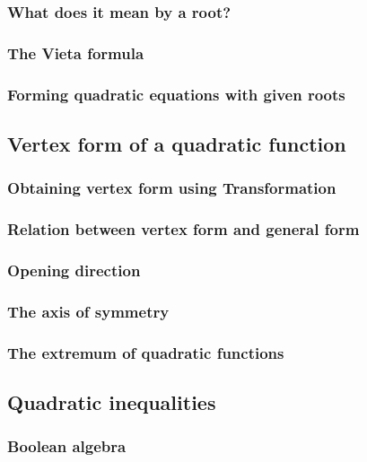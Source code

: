 \documentclass[12pt]{article}
\begin{document}
    \subsubsection{What does it mean by a root?}

    \subsubsection{The Vieta formula}

    \subsubsection{Forming quadratic equations with given roots}

    \subsection{Vertex form of a quadratic function}

    \subsubsection{Obtaining vertex form using Transformation}

    \subsubsection{Relation between vertex form and general form}

    \subsubsection{Opening direction}

    \subsubsection{The axis of symmetry}

    \subsubsection{The extremum of quadratic functions}

    \subsection{Quadratic inequalities}

    \subsubsection{Boolean algebra}
\end{document}
